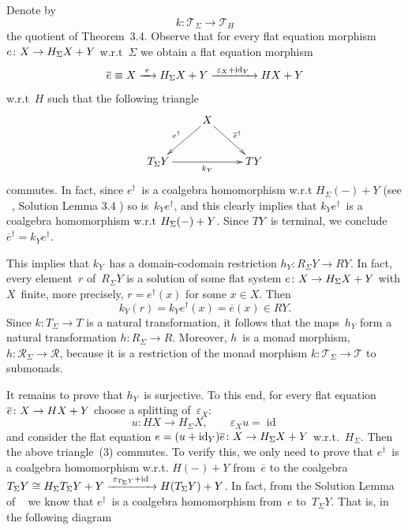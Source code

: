 \documentclass{entcs}
\newcommand{\TT}{\ensuremath{\mathscr{T}}}
\newcommand{\RR}{\ensuremath{\mathscr{R}}}
\DeclareMathOperator{\id}{id}
\begin{document}
\begin{pf}
Denote by
\[k\colon\TT_\Sigma\to\TT_H\]
the quotient of Theorem~3.4. Observe that for every flat equation
morphism $e\colon X\to H_\Sigma X+\nolinebreak Y$ w.r.t~$\Sigma$ we
obtain a flat equation morphism
\[\overline{e}\equiv X\xrightarrow{\rule{1mm}{0mm}e\rule{1mm}{0mm}}
H_\Sigma X+Y
\xrightarrow{\rule{1mm}{0mm}\varepsilon_X+\id_Y\rule{1mm}{0mm}}
HX+Y\]
w.r.t~$H$ such that the following triangle
\begin{equation}
\vcenter{
\xy
\xymatrix{
&
X
\ar[1,-1]_{e^\dag}
\ar[1,1]^{\overline{e}^\dag}
&
\\
T_\Sigma Y
\ar[0,2]_-{k_Y}
&
&
TY
}
\endxy
}
\end{equation}
commutes. In fact, since $e^\dag$~is a coalgebra homomorphism w.r.t
$H_\Sigma({-})+Y$ (see ~\cite{aamv}, Solution Lemma 3.4 ) so
is~$k_Ye^\dag$, and this clearly implies that $k_Ye^\dag$~is a
coalgebra homomorphism w.r.t
$H_\Sigma({-})+\nolinebreak Y$. Since $TY$~is
terminal, we conclude $\overline{e}^\dag=k_Ye^\dag$.

This implies that $k_Y$~has a domain-codomain restriction
$h_Y\colon R_\Sigma Y\to RY$. In fact, every element~$r$ of~$R_\Sigma
Y$ is a solution of some flat system $e\colon X\to H_\Sigma
X+\nolinebreak Y$ with $X$~finite, more precisely, $r=e^\dag(x)$ for
some $x\in X$. Then
\[k_Y(r)=k_Ye^\dag(x)=\overline{e}(x)\in RY.\]
Since $k\colon T_\Sigma\to T$ is a natural transformation, it
follows that the maps~$h_Y$ form a natural transformation $h\colon
R_\Sigma\to R$. Moreover, $h$~is a monad morphism,
$h\colon\RR_\Sigma\to\RR$, because it is a restriction of the monad
morphism $k\colon\TT_\Sigma\to\TT$ to submonads.

It remains to prove that $h_Y$~is surjective. To this end, for every
flat equation $\overline{e}\colon X\to HX+\nolinebreak Y$ choose a
splitting of~$\varepsilon_X$:
\[u\colon HX\to H_\Sigma X,\qquad \varepsilon_Xu=\id\]
and consider the flat equation $e=(u+\id_Y)\overline{e}\colon X\to
H_\Sigma X+\nolinebreak Y$ w.r.t.~$H_\Sigma$. Then the above
triangle~(3) commutes. To verify this, we only need to prove
that $e^\dag$~is a coalgebra homomorphism w.r.t.
$H({-})+Y$ from~$\overline{e}$ to the coalgebra
$T_\Sigma Y\cong H_\Sigma T_\Sigma
Y+Y\xrightarrow{\rule{1mm}{0mm}\varepsilon_{T_\Sigma
Y}+\id\rule{1mm}{0mm}}H(T_\Sigma Y)+\nolinebreak Y$. In fact, from
the Solution Lemma of ~\cite{aamv} we know that $e^\dag$~is a coalgebra homomorphism
from~$e$ to~$T_\Sigma Y$. That is, in the following diagram
\vspace{1mm}


\end{pf}
\end{document}
